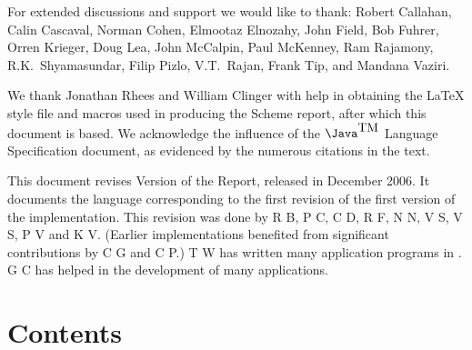 For extended discussions and support we would like to thank: 
Robert Callahan, Calin
Cascaval, Norman Cohen, Elmootaz Elnozahy, John Field, Bob Fuhrer,
Orren Krieger, Doug Lea, John McCalpin, Paul McKenney, Ram Rajamony,
R.K.~Shyamasundar, Filip Pizlo, V.T.~Rajan, Frank Tip, and Mandana Vaziri.

We thank Jonathan Rhees and William Clinger with help in obtaining the
\LaTeX{} style file and macros used in producing the Scheme report,
after which this document is based. We acknowledge the influence of
the $\mbox{\Java}^{\mbox{TM}}$ Language Specification \cite{jls2}
document, as evidenced by the numerous citations in the text.

This document revises Version {} of the Report, released in
December 2006. It documents the language corresponding to the first
revision of the first version of the implementation.  This
revision was done by
R B, 
P C, 
C D, 
R F,
N N,  
V S,
V S,
P V and
K V.
(Earlier implementations benefited from significant contributions by
C G and 
C P.)
T W has written many application programs
in \Xten{}. G C has helped in the
development of many applications.



\vfill
\eject


\chapter*{Contents}
\addvspace{3.5pt}                  %
\renewcommand{\tocshrink}{-3.5pt}  %
{\footnotesize
\tableofcontents
}

\vfill
\eject


